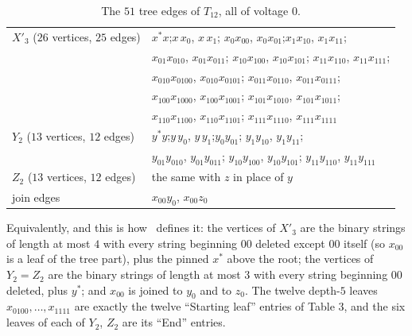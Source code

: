 \documentclass[11pt]{amsart}
\theoremstyle{remark}
\newcommand{\Tt}{T_{12}}
\begin{document}
\begin{table}[ht]
\caption{The $51$ tree edges of $\Tt$, all of voltage $0$.}\label{tab:tree}
\small
\begin{tabular}{@{}l@{\;}l@{}}
\toprule
$X'_3$ ($26$ vertices, $25$ edges)
 & $x^*x$;\quad $x\,x_0$, $x\,x_1$;\quad
   $x_0x_{00}$, $x_0x_{01}$;\quad $x_1x_{10}$, $x_1x_{11}$;\\
 & $x_{01}x_{010}$, $x_{01}x_{011}$;\quad
   $x_{10}x_{100}$, $x_{10}x_{101}$;\quad
   $x_{11}x_{110}$, $x_{11}x_{111}$;\\
 & $x_{010}x_{0100}$, $x_{010}x_{0101}$;\quad
   $x_{011}x_{0110}$, $x_{011}x_{0111}$;\\
 & $x_{100}x_{1000}$, $x_{100}x_{1001}$;\quad
   $x_{101}x_{1010}$, $x_{101}x_{1011}$;\\
 & $x_{110}x_{1100}$, $x_{110}x_{1101}$;\quad
   $x_{111}x_{1110}$, $x_{111}x_{1111}$\\
\midrule
$Y_2$ ($13$ vertices, $12$ edges)
 & $y^*y$;\quad $y\,y_0$, $y\,y_1$;\quad $y_0y_{01}$;\quad
   $y_1y_{10}$, $y_1y_{11}$;\\
 & $y_{01}y_{010}$, $y_{01}y_{011}$;\quad
   $y_{10}y_{100}$, $y_{10}y_{101}$;\quad
   $y_{11}y_{110}$, $y_{11}y_{111}$\\
\midrule
$Z_2$ ($13$ vertices, $12$ edges)
 & the same with $z$ in place of $y$\\
\midrule
join edges & $x_{00}y_0$, \quad $x_{00}z_0$\\
\bottomrule
\end{tabular}
\end{table}

Equivalently, and this is how~\cite{AAB} defines it: the vertices of $X'_3$ are
the binary strings of length at most $4$ with every string beginning $00$
deleted except $00$ itself (so $x_{00}$ is a leaf of the tree part), plus the
pinned $x^*$ above the root; the vertices of $Y_2 = Z_2$ are the binary strings
of length at most $3$ with every string beginning $00$ deleted, plus $y^*$;
and $x_{00}$ is joined to $y_0$ and to $z_0$. The twelve depth-$5$ leaves
$x_{0100}, \dots, x_{1111}$ are exactly the twelve ``Starting leaf'' entries of
Table 3, and the six leaves of each of $Y_2$, $Z_2$ are its ``End'' entries.
\end{document}
